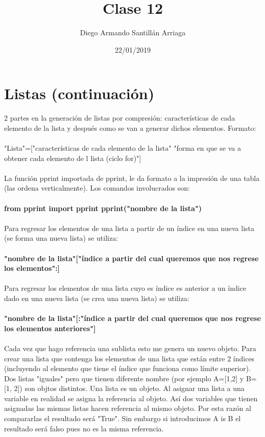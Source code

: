 \documentclass[letter paper, 12pt, oneside]{article}
\title{\Huge Clase 12}
\author{Diego Armando Santillán Arriaga}
\date{22/01/2019}
\begin{document}
	\maketitle	
	\newpage
\section{Listas (continuación)}

2 partes en la generación de listas por compresión: 
características de cada elemento de la lista y después como se van a generar dichos elementos.
Formato:
\\\\
"Lista"=["características de cada elemento de la lista" "forma en que se va a obtener cada elemento de l lista (ciclo for)"]
\\\\
La función pprint importada de pprint, le da formato a la impresión de una tabla (las ordena verticalmente). Los comandos involucrados son:
\\\\
\textbf{from pprint import pprint
pprint("nombre de la lista")}
\\\\
Para regresar los elementos de una lista a partir de un índice en una nueva lista (se forma una nueva lista) se utiliza: 
\\\\
\textbf{"nombre de la lista"["índice a partir del cual queremos que nos regrese los elementos":]}
\\\\
Para regresar los elementos de una lista cuyo es índice es anterior a un índice dado en una nueva lista (se crea una nueva lista) se utiliza: 
\\\\
\textbf{"nombre de la lista"[:"índice a partir del cual queremos que nos regrese los elementos anteriores"]}
\\\\
Cada vez que hago referencia una sublista esto me genera un nuevo objeto.
Para crear una lista que contenga los elementos de una lista que están entre 2 índices (incluyendo al elemento que tiene el índice que funciona como límite superior).
Dos listas "iguales" pero que tienen diferente nombre (por ejemplo A=[1,2] y B=[1, 2]) son objtos distintos.
Una lista es un objeto. Al asignar una lista a una variable en realidad se asigna la referencia al objeto. Así dos variables que tienen asignadas las mismas listas hacen referencia al mismo objeto. Por esta razón al compararlas el resultado será "True". Sin embargo si introducimos A is B el resultado será falso pues no es la misma referencia. 
\end{document}
